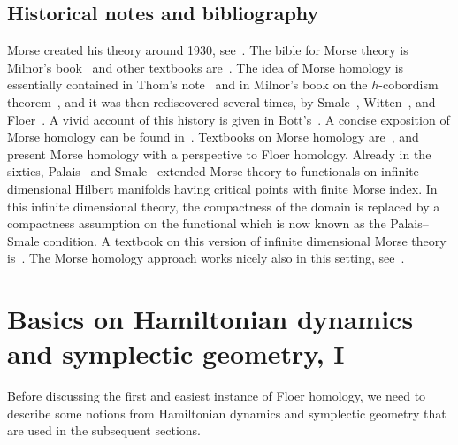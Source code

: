 \documentclass[12pt,twoside]{amsart}
\theoremstyle{plain}
\numberwithin{figure}{section}
\numberwithin{equation}{section}
\begin{document}
\subsection*{Historical notes and bibliography}
Morse created his theory around 1930, see~\cite{Mor32}.      
The bible for Morse theory is Milnor's book~\cite{Mi63} 
and other textbooks are~\cite{Ma02,Ni11,TaMePi01}.
%
The idea of Morse homology is essentially contained in Thom's note~\cite{Th49} and in Milnor's book 
on the $h$-cobordism theorem~\cite{Mil65}, and it was then rediscovered several times, 
by Smale~\cite{Sm67}, Witten~\cite{Wi82}, and Floer~\cite{Flo88:Lag}.
A vivid account of this history is given in Bott's~\cite{Bo89}. A concise exposition of Morse homology can be found in~\cite{Web06}. Textbooks on Morse homology are~\cite{AuDa14,BaHu04}, 
and~\cite{Hu02,Schw93} present Morse homology with a perspective to Floer homology. 
Already in the sixties, Palais~\cite{Pal63} and Smale~\cite{Sma64a,Sma64b} extended Morse theory to functionals on infinite dimensional Hilbert manifolds having critical points with finite Morse index. 
In this infinite dimensional theory, the compactness of the domain is replaced by a compactness assumption on the functional which is now known as the Palais--Smale condition. A textbook on this version of infinite dimensional Morse theory is~\cite{Cha93}. The Morse homology approach works nicely also in this setting, 
see~\cite{AbbMaj06}. 


\section{Basics on Hamiltonian dynamics and symplectic geometry, I} 
\label{s:basicsI}

Before discussing the first and easiest instance of Floer homology, we need to describe some notions from Hamiltonian dynamics and symplectic geometry that are used in the subsequent sections.
\end{document}
